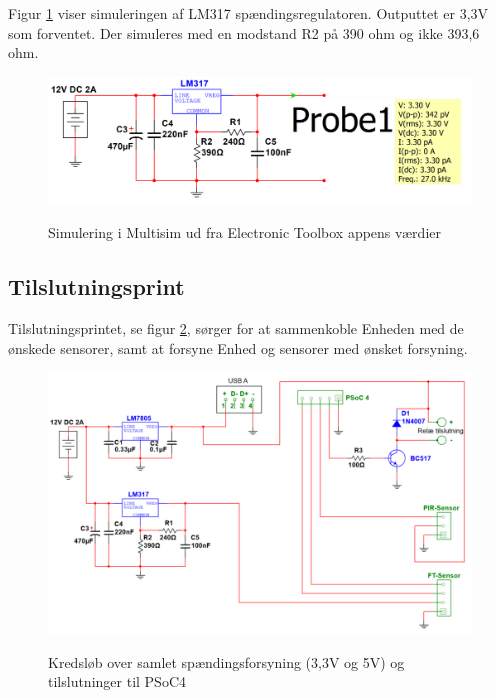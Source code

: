 Figur \ref{lab:LM317_SIMULERING} viser simuleringen af LM317 spændingsregulatoren. Outputtet er 3,3V som forventet. Der simuleres med en modstand R2 på 390 ohm og ikke 393,6 ohm.

\begin{figure}[H] \centering
{\includegraphics[width=\textwidth]{filer/design/Billeder/LM317_SIMULATION}}
\caption{Simulering i Multisim ud fra Electronic Toolbox appens værdier}
\label{lab:LM317_SIMULERING}
\raggedright
\end{figure}


\subsection{Tilslutningsprint}

Tilslutningsprintet, se figur \ref{lab:PSU_connections}, sørger for at sammenkoble Enheden med de ønskede sensorer, samt at forsyne Enhed og sensorer med ønsket forsyning.

\begin{figure}[H] \centering
{\includegraphics[width=\textwidth]{filer/design/Billeder/tilslutningsprint}}
\caption{Kredsløb over samlet spændingsforsyning (3,3V og 5V) og tilslutninger til PSoC4}
\label{lab:PSU_connections}
\raggedright
\end{figure}

